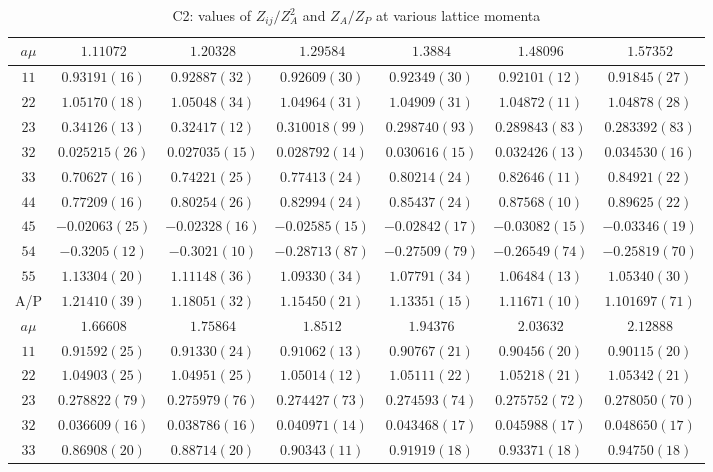 \begin{table}
\begin{center}
\caption{C2: values of $Z_{ij}/Z_A^2$ and $Z_A/Z_P$ at various lattice momenta}
\begin{tabular}{c|c c c c c c}
\hline
\hline
$a\mu$ & $1.11072$ & $1.20328$ & $1.29584$ & $1.3884$ & $1.48096$ & $1.57352$ \\
\hline
$11$ & $0.93191(16)$ & $0.92887(32)$ & $0.92609(30)$ & $0.92349(30)$ & $0.92101(12)$ & $0.91845(27)$ \\
$22$ & $1.05170(18)$ & $1.05048(34)$ & $1.04964(31)$ & $1.04909(31)$ & $1.04872(11)$ & $1.04878(28)$ \\
$23$ & $0.34126(13)$ & $0.32417(12)$ & $0.310018(99)$ & $0.298740(93)$ & $0.289843(83)$ & $0.283392(83)$ \\
$32$ & $0.025215(26)$ & $0.027035(15)$ & $0.028792(14)$ & $0.030616(15)$ & $0.032426(13)$ & $0.034530(16)$ \\
$33$ & $0.70627(16)$ & $0.74221(25)$ & $0.77413(24)$ & $0.80214(24)$ & $0.82646(11)$ & $0.84921(22)$ \\
$44$ & $0.77209(16)$ & $0.80254(26)$ & $0.82994(24)$ & $0.85437(24)$ & $0.87568(10)$ & $0.89625(22)$ \\
$45$ & $-0.02063(25)$ & $-0.02328(16)$ & $-0.02585(15)$ & $-0.02842(17)$ & $-0.03082(15)$ & $-0.03346(19)$ \\
$54$ & $-0.3205(12)$ & $-0.3021(10)$ & $-0.28713(87)$ & $-0.27509(79)$ & $-0.26549(74)$ & $-0.25819(70)$ \\
$55$ & $1.13304(20)$ & $1.11148(36)$ & $1.09330(34)$ & $1.07791(34)$ & $1.06484(13)$ & $1.05340(30)$ \\
\hline
A/P & $1.21410(39)$ & $1.18051(32)$ & $1.15450(21)$ & $1.13351(15)$ & $1.11671(10)$ & $1.101697(71)$ \\
\hline
$a\mu$ & $1.66608$ & $1.75864$ & $1.8512$ & $1.94376$ & $2.03632$ & $2.12888$ \\
\hline
$11$ & $0.91592(25)$ & $0.91330(24)$ & $0.91062(13)$ & $0.90767(21)$ & $0.90456(20)$ & $0.90115(20)$ \\
$22$ & $1.04903(25)$ & $1.04951(25)$ & $1.05014(12)$ & $1.05111(22)$ & $1.05218(21)$ & $1.05342(21)$ \\
$23$ & $0.278822(79)$ & $0.275979(76)$ & $0.274427(73)$ & $0.274593(74)$ & $0.275752(72)$ & $0.278050(70)$ \\
$32$ & $0.036609(16)$ & $0.038786(16)$ & $0.040971(14)$ & $0.043468(17)$ & $0.045988(17)$ & $0.048650(17)$ \\
$33$ & $0.86908(20)$ & $0.88714(20)$ & $0.90343(11)$ & $0.91919(18)$ & $0.93371(18)$ & $0.94750(18)$ \\

\end{tabular}
\end{center}
\end{table}

